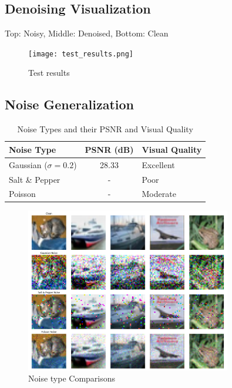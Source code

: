 \documentclass[final]{article}
\begin{document}
\subsection{Denoising Visualization}
Top: Noisy, Middle: Denoised, Bottom: Clean

\afterpage{\clearpage} %
\begin{figure}[h]
    \centering
    \texttt{[image: test\_results.png]}
    \caption{Test results}
    \label{fig:image_label}
\end{figure}

\subsection{Noise Generalization}
\begin{table}[h]
    \centering
    \begin{tabular}{|l|c|l|}
        \hline
        \textbf{Noise Type} & \textbf{PSNR (dB)} & \textbf{Visual Quality} \\
        \hline
        Gaussian ($\sigma = 0.2$) & 28.33 & Excellent \\
        Salt \& Pepper & - & Poor \\
        Poisson & - & Moderate \\
        \hline
    \end{tabular}
    \caption{Noise Types and their PSNR and Visual Quality}
    \label{tab:noise_types}
\end{table}
\afterpage{\clearpage} %
\begin{figure}[h]
    \centering
    \includegraphics[width=0.8\textwidth]{noise_types_comparison.png}
    \caption{Noise type Comparisons}
    \label{fig:image_label}
\end{figure}
\end{document}
